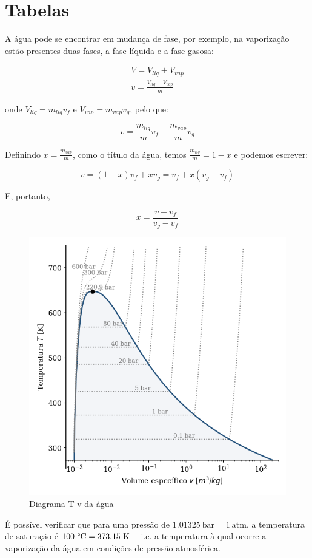 
\section{Tabelas}

A água pode se encontrar em mudança de fase, por exemplo, na vaporização estão presentes duas fases, a fase líquida e a fase gasosa:

\begin{eqnarray}
    V = V_{liq} + V_{vap}\\
    v = \frac{V_{liq} + V_{vap}}{m}
\end{eqnarray}

onde $V_{liq} = m_{liq} v_f$ e $V_{vap} = m_{vap} v_g$, pelo que:

\begin{equation}
    v = \frac{m_{liq}}{m} v_f + \frac{m_{vap}}{m} v_g
\end{equation}

Definindo $x = \frac{m_{vap}}{m}$, como o título da água, temos $\frac{m_{liq}}{m} = 1 - x$ e podemos escrever:

\begin{equation}
    v = (1-x) v_f + x v_g = v_f + x(v_g - v_f)
\end{equation}

E, portanto,

\begin{equation}
    x = \frac{v-v_f}{v_g-v_f}
\end{equation}

\begin{figure}[H]
    \centering
    \includegraphics[width=0.4\linewidth]{graphs/water-dome-Tv-critical.png}
    \caption{Diagrama T-v da água}
    \label{fig:water-dome-Tv}
\end{figure}

É possível verificar que para uma pressão de $1.01325~\text{bar} = 1~\text{atm}$, a temperatura de saturação é $100~\text{\textdegree C} = 373.15~\text{K}$ -- i.e. a temperatura à qual ocorre a vaporização da água em condições de pressão atmosférica.

